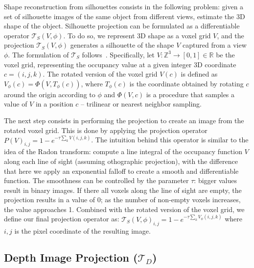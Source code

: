 Shape reconstruction from silhouettes consists in the following problem: given a set of silhouette images of the same object from different views, estimate the 3D shape of the object.
Silhouette projection can be formulated as a differentiable operator $\mathcal{T}_S(V,\phi)$. To do so, we represent 3D shape as a voxel grid $V$, and the projection $\mathcal{T}_S(V,\phi)$ generates a silhouette of the shape $V$ captured from a view $\phi$.
The formulation of $\mathcal{T}_S$ follows~\cite{prgan}. Specifically, let $V : \mathbb{Z}^3 \rightarrow [0,1] \in \mathbb{R}$ be the voxel grid, representing the occupancy value at a given integer 3D coordinate $c=(i,j,k)$. %
The rotated version of the voxel grid $V(c)$ is defined as 
$V_{\phi}(c) = \Phi(V, T_\phi(c))$,
where $T_\phi(c)$ is the coordinate obtained by rotating $c$ around the origin
according to $\phi$ and $\Phi(V, c)$ is a procedure that samples a value of $V$ in a position $c$ -- trilinear or nearest neighbor sampling.

The next step consists in performing the projection to create an image from the rotated voxel grid.
This is done by applying the projection operator 
$P(V)_{i,j} = 1 - e^{-\tau \sum_{k}V(i,j,k)}$.
The intuition behind this operator is similar to the idea of the Radon transform: compute a line integral of the occupancy function $V$ along each line of sight (assuming othographic projection), with the difference that
here we apply an exponential falloff to create a smooth and differentiable function.
The smoothness can be controlled by the parameter $\tau$: bigger values result in binary images.
If there all voxels along the line of sight are empty, the projection results in a value of 0; as the number of non-empty voxels increases, the value approaches 1.
Combined with the rotated version of the voxel grid, we define our final projection operator as:
$\mathcal{T}_S(V,\phi)_{i,j} = 1 - e^{-\tau \sum_{k}V_{\phi}(i,j,k)}$ where $i, j$ is the pixel coordinate of the resulting image.

\subsection{Depth Image Projection ($\mathcal{T}_D$)}

